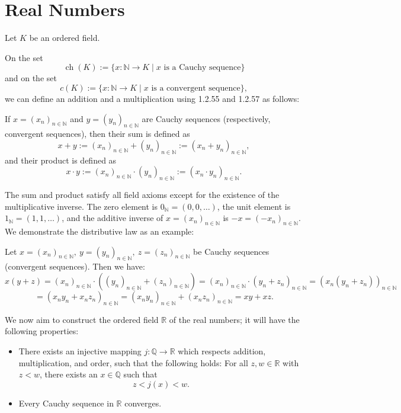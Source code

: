 \newpage
\section{Real Numbers}

Let \( K \) be an ordered field.

On the set
		\[
			\operatorname{ch}(K) := \{ x : \mathbb{N} \to K \mid x \text{ is a Cauchy sequence} \}
		\]
		and on the set
		\[
			c(K) := \{ x : \mathbb{N} \to K \mid x \text{ is a convergent sequence} \},
		\]
		we can define an addition and a multiplication using 1.2.55 and 1.2.57 as follows:

		If \( x = (x_n)_{n \in \mathbb{N}} \) and \( y = (y_n)_{n \in \mathbb{N}} \) are Cauchy sequences (respectively, convergent sequences), then their sum is defined as
		\[
			x + y := (x_n)_{n \in \mathbb{N}} + (y_n)_{n \in \mathbb{N}} := (x_n + y_n)_{n \in \mathbb{N}},
		\]
		and their product is defined as
		\[
			x \cdot y := (x_n)_{n \in \mathbb{N}} \cdot (y_n)_{n \in \mathbb{N}} := (x_n \cdot y_n)_{n \in \mathbb{N}}.
		\]

The sum and product satisfy all field axioms except for the existence of the multiplicative inverse.
The zero element is \( 0_{\mathbb{N}} = (0, 0, \ldots) \), the unit element is \( 1_{\mathbb{N}} = (1, 1, \ldots) \), and the additive inverse of \( x = (x_n)_{n \in \mathbb{N}} \) is \( -x = (-x_n)_{n \in \mathbb{N}} \).
We demonstrate the distributive law as an example:

Let \( x = (x_n)_{n \in \mathbb{N}},\ y = (y_n)_{n \in \mathbb{N}},\ z = (z_n)_{n \in \mathbb{N}} \) be Cauchy sequences (convergent sequences). Then we have:
\[
	x(y + z) = (x_n)_{n \in \mathbb{N}} \cdot \left( (y_n)_{n \in \mathbb{N}} + (z_n)_{n \in \mathbb{N}} \right)
	= (x_n)_{n \in \mathbb{N}} \cdot (y_n + z_n)_{n \in \mathbb{N}}
	= (x_n (y_n + z_n))_{n \in \mathbb{N}}
\]
\[
	= (x_n y_n + x_n z_n)_{n \in \mathbb{N}}
	= (x_n y_n)_{n \in \mathbb{N}} + (x_n z_n)_{n \in \mathbb{N}}
	= xy + xz.
\]

We now aim to construct the ordered field \( \mathbb{R} \) of the real numbers;
it will have the following properties:

\begin{itemize}[label=\(-\)]
	\item There exists an injective mapping \( j : \mathbb{Q} \to \mathbb{R} \) which respects addition, multiplication, and order, such that the following holds:
		For all \( z, w \in \mathbb{R} \) with \( z < w \), there exists an \( x \in \mathbb{Q} \) such that
		\[
			z < j(x) < w.
		\]

	\item Every Cauchy sequence in \( \mathbb{R} \) converges.

\end{itemize}

